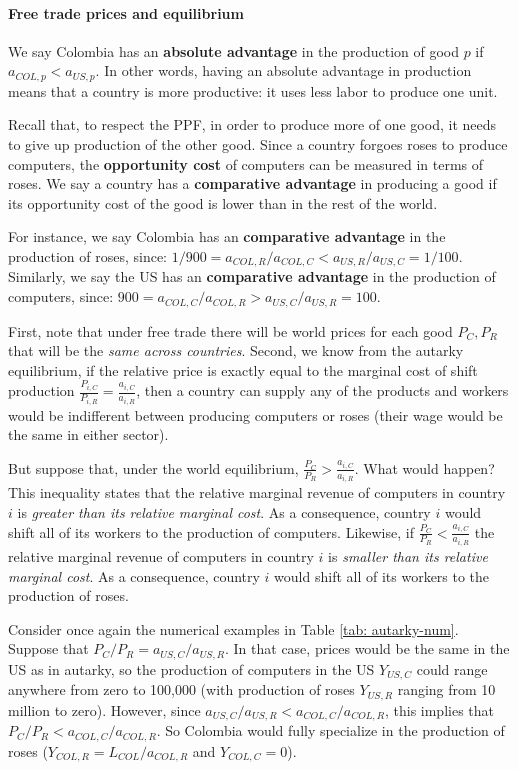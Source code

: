\documentclass[11pt,letterpaper]{article}
\begin{document}
\newpage


\paragraph{Free trade prices and equilibrium} We say Colombia has an \textbf{absolute advantage} in the production of good $p$ if $a_{COL,p} < a_{US,p}$. In other words, having an  absolute advantage in production means that a country is more productive: it uses less labor to produce one unit. 

Recall that, to respect the PPF, in order to produce more of one good, it needs to give up production of the other good. Since a country forgoes roses to produce computers, the \textbf{opportunity cost} of computers can be measured in terms of roses. We say a country has a \textbf{comparative advantage} in producing a good if its opportunity cost of the good is lower than in the rest of the world.

For instance, we say Colombia has an \textbf{comparative advantage} in the production of roses, since: $1/900 = a_{COL,R}/a_{COL,C} < a_{US,R}/a_{US,C} = 1/100$. Similarly, we say the US has an \textbf{comparative advantage} in the production of computers, since: $900 = a_{COL,C}/a_{COL,R} > a_{US,C}/a_{US,R} = 100$.

First, note that under free trade there will be world prices for each good $P_C, P_R$ that will be the \textit{same across countries}. Second, we know from the autarky equilibrium, if the relative price is exactly equal to the marginal cost of shift production $\frac{P_{i,C}}{P_{i,R}} = \frac{a_{i,C}}{a_{i,R}}$, then a country can supply any of the products and workers would be indifferent between producing computers or roses (their wage would be the same in either sector).

But suppose that, under the world equilibrium, $\frac{P_{C}}{P_{R}} > \frac{a_{i,C}}{a_{i,R}}$. What would happen? This inequality states that the relative marginal revenue of computers in country $i$ is \textit{greater than its relative marginal cost}. As a consequence, country $i$ would shift all of its workers to the production of computers. Likewise, if $\frac{P_{C}}{P_{R}} < \frac{a_{i,C}}{a_{i,R}}$ the relative marginal revenue of computers in country $i$ is \textit{smaller than its relative marginal cost}. As a consequence, country $i$ would shift all of its workers to the production of roses. 

Consider once again the numerical examples in Table \ref{tab: autarky-num}. Suppose that $P_C/P_R = a_{US,C}/ a_{US,R}$. In that case, prices would be the same in the US as in autarky, so the production of computers in the US $Y_{US,C}$ could range anywhere from zero to 100,000 (with production of roses $Y_{US,R}$ ranging from 10 million to zero). However, since $a_{US,C}/ a_{US,R} < a_{COL,C}/a_{COL,R}$, this implies that $P_C/P_R < a_{COL,C}/a_{COL,R}$. So Colombia would fully specialize in the production of roses ($Y_{COL,R} = L_{COL}/a_{COL,R}$ and $Y_{COL,C} = 0$).
\end{document}
